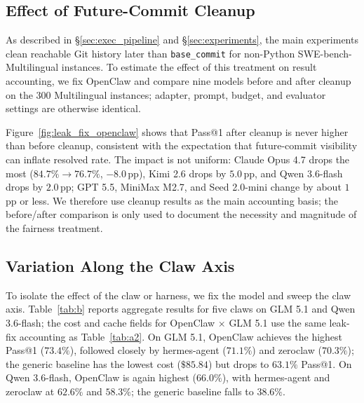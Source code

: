 \subsection{Effect of Future-Commit Cleanup}\label{sec:leak_fix}

As described in \S\ref{sec:exec_pipeline} and \S\ref{sec:experiments}, the main experiments clean reachable Git history later than \texttt{base\_commit} for non-Python SWE-bench-Multilingual instances. To estimate the effect of this treatment on result accounting, we fix OpenClaw and compare nine models before and after cleanup on the 300 Multilingual instances; adapter, prompt, budget, and evaluator settings are otherwise identical.



Figure~\ref{fig:leak_fix_openclaw} shows that Pass@1 after cleanup is never higher than before cleanup, consistent with the expectation that future-commit visibility can inflate resolved rate. The impact is not uniform: Claude Opus 4.7 drops the most ($84.7\%\rightarrow76.7\%$, $-8.0$\,pp), Kimi 2.6 drops by $5.0$\,pp, and Qwen 3.6-flash drops by $2.0$\,pp; GPT 5.5, MiniMax M2.7, and Seed 2.0-mini change by about $1$\,pp or less. We therefore use cleanup results as the main accounting basis; the before/after comparison is only used to document the necessity and magnitude of the fairness treatment.

\subsection{Variation Along the Claw Axis}\label{sec:variation_harnesses}

To isolate the effect of the claw or harness, we fix the model and sweep the claw axis. Table~\ref{tab:b} reports aggregate results for five claws on GLM 5.1 and Qwen 3.6-flash; the cost and cache fields for OpenClaw $\times$ GLM 5.1 use the same leak-fix accounting as Table~\ref{tab:a2}. On GLM 5.1, OpenClaw achieves the highest Pass@1 ($73.4\%$), followed closely by hermes-agent ($71.1\%$) and zeroclaw ($70.3\%$); the generic baseline has the lowest cost ($\$85.84$) but drops to $63.1\%$ Pass@1. On Qwen 3.6-flash, OpenClaw is again highest ($66.0\%$), with hermes-agent and zeroclaw at $62.6\%$ and $58.3\%$; the generic baseline falls to $38.6\%$.

